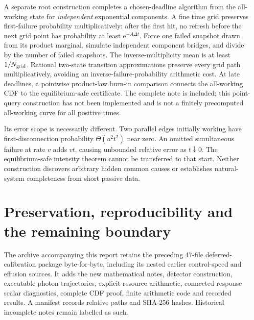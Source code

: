 \documentclass[11pt]{article}
\newcommand{\ee}{\mathrm e}
\begin{document}
A separate root construction completes a chosen-deadline algorithm from the all-working state for \emph{independent} exponential components. A fine time grid preserves first-failure probability multiplicatively: after the first hit, no refresh before the next grid point has probability at least \(\ee^{-A\Delta t}\). Force one failed snapshot drawn from its product marginal, simulate independent component bridges, and divide by the number of failed snapshots. The inverse-multiplicity mean is at least \(1/N_{\rm grid}\). Rational two-state transition approximations preserve every grid path multiplicatively, avoiding an inverse-failure-probability arithmetic cost. At late deadlines, a pointwise product-law burn-in comparison connects the all-working CDF to the equilibrium-safe certificate. The complete note is included; this point-query construction has not been implemented and is not a finitely precomputed all-working curve for all positive times.

Its error scope is necessarily different. Two parallel edges initially working have first-disconnection probability \(\Theta(a^2t^2)\) near zero. An omitted simultaneous failure at rate \(v\) adds \(vt\), causing unbounded relative error as \(t\downarrow0\). The equilibrium-safe intensity theorem cannot be transferred to that start. Neither construction discovers arbitrary hidden common causes or establishes natural-system completeness from short passive data.

\section{Preservation, reproducibility and the remaining boundary}
The archive accompanying this report retains the preceding 47-file deferred-calibration package byte-for-byte, including its nested earlier control-speed and effusion sources. It adds the new mathematical notes, detector construction, executable photon trajectories, explicit resource arithmetic, connected-response scalar diagnostics, complete CDF proof, finite arithmetic code and recorded results. A manifest records relative paths and SHA-256 hashes. Historical incomplete notes remain labelled as such.
\end{document}
